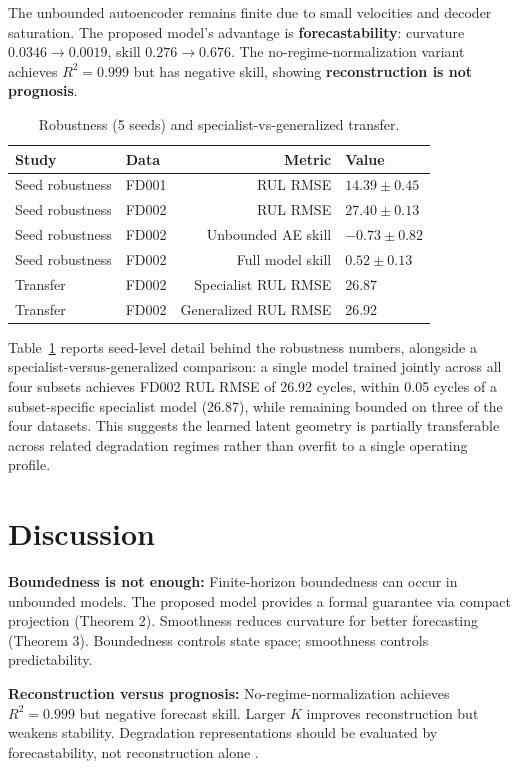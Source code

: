 \documentclass[letterpaper]{article}
\begin{document}
The unbounded autoencoder remains finite due to small velocities and decoder saturation. The proposed model's advantage is \textbf{forecastability}: curvature $0.0346 \to 0.0019$, skill $0.276 \to 0.676$. The no-regime-normalization variant achieves $R^2 = 0.999$ but has negative skill, showing \textbf{reconstruction is not prognosis}.

\begin{table}[t]
\small
\centering
\caption{Robustness (5 seeds) and specialist-vs-generalized transfer.}
\label{tab:robust}
\begin{tabular}{llrl}
\toprule
Study & Data & Metric & Value \\
\midrule
Seed robustness & FD001 & RUL RMSE & $14.39\pm0.45$ \\
Seed robustness & FD002 & RUL RMSE & $27.40\pm0.13$ \\
Seed robustness & FD002 & Unbounded AE skill & $-0.73\pm0.82$ \\
Seed robustness & FD002 & Full model skill & $0.52\pm0.13$ \\
Transfer & FD002 & Specialist RUL RMSE & 26.87 \\
Transfer & FD002 & Generalized RUL RMSE & 26.92 \\
\bottomrule
\end{tabular}
\end{table}

Table~\ref{tab:robust} reports seed-level detail behind the robustness numbers, alongside a specialist-versus-generalized comparison: a single model trained jointly across all four subsets achieves FD002 RUL RMSE of 26.92 cycles, within 0.05 cycles of a subset-specific specialist model (26.87), while remaining bounded on three of the four datasets. This suggests the learned latent geometry is partially transferable across related degradation regimes rather than overfit to a single operating profile.

\section{Discussion}

\textbf{Boundedness is not enough:} Finite-horizon boundedness can occur in unbounded models. The proposed model provides a formal guarantee via compact projection (Theorem 2). Smoothness reduces curvature for better forecasting (Theorem 3). Boundedness controls state space; smoothness controls predictability.

\textbf{Reconstruction versus prognosis:} No-regime-normalization achieves $R^2 = 0.999$ but negative forecast skill. Larger $K$ improves reconstruction but weakens stability. Degradation representations should be evaluated by forecastability, not reconstruction alone \cite{torres2021deep,li2019deep}.
\end{document}
